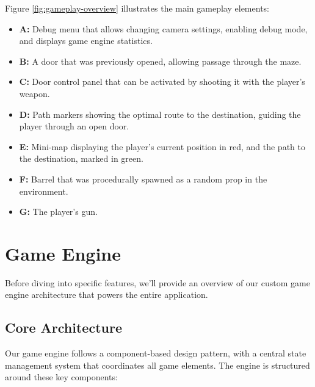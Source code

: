 \documentclass{article}
\begin{document}
Figure \ref{fig:gameplay-overview} illustrates the main gameplay elements:
\begin{itemize}
    \item \textbf{A:} Debug menu that allows changing camera settings, enabling debug mode, and displays game engine statistics.
    \item \textbf{B:} A door that was previously opened, allowing passage through the maze.
    \item \textbf{C:} Door control panel that can be activated by shooting it with the player's weapon.
    \item \textbf{D:} Path markers showing the optimal route to the destination, guiding the player through an open door.
    \item \textbf{E:} Mini-map displaying the player's current position in red,  and the path to the destination, marked in green.
    \item \textbf{F:} Barrel that was procedurally spawned as a random prop in the environment.
    \item \textbf{G:} The player's gun.
\end{itemize}


\section{Game Engine}
Before diving into specific features, we'll provide an overview of our custom game engine architecture that powers the entire application.

\subsection{Core Architecture}
Our game engine follows a component-based design pattern, with a central state management system that coordinates all game elements. The engine is structured around these key components:
\end{document}
